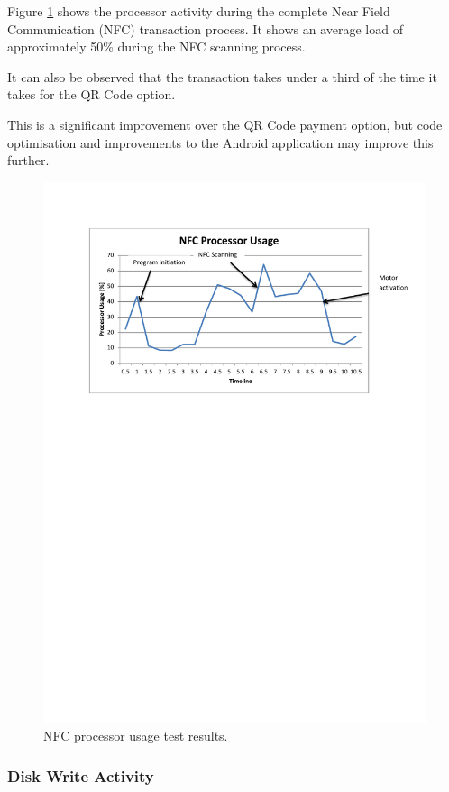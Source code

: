 Figure \ref{fig:nfc_test_cpu} shows the processor activity during the complete Near
Field Communication (NFC) transaction process. It shows an average load of approximately
50\% during the NFC scanning process.

It can also be observed that the transaction takes under a third of the time it takes for
the QR Code option. 

This is a significant improvement over the QR Code payment option, but code optimisation
and improvements to the Android application may improve this further. 

\begin{figure}
 \centering 
 \includegraphics[clip=true, trim = 0 500 0 70,
 scale=0.7]{nfc_test_cpu}
 \caption{NFC processor usage test results.}
 \label{fig:nfc_test_cpu}
\end{figure}

\subsubsection{Disk Write Activity}

